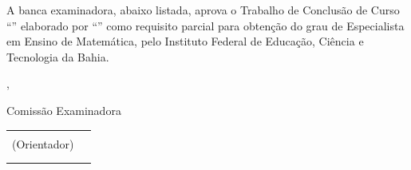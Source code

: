 %
%
\makeatletter
\begin{folhadeaprovacao}

	\begin{center}
		\ABNTEXchapterfont\textbf{\MakeUppercase\imprimirautor}
	\end{center}

	\vspace*{50pt}

	\begin{center}
		\ABNTEXchapterfont\textbf{\MakeUppercase\imprimirtitulo}
		\abntex@ifnotempty{\imprimirsubtitulo}{
			{\ABNTEXchapterfont\Large\scshape{\hspace*{-0.3em}: }}{\ABNTEXchapterfont\large\scshape\imprimirsubtitulo}
		}
	\end{center}
	\vspace*{30pt}
A banca examinadora, abaixo listada, aprova o Trabalho de Conclusão de Curso “\imprimirtitulo” elaborado por “\imprimirautor” como requisito parcial para obtenção do grau de Especialista em Ensino de Matemática, pelo Instituto Federal de Educação, Ciência e Tecnologia da Bahia.
	\vspace*{30pt}

	\begin{center}
		\imprimirlocal, \imprimirdatadefesa
		\end{center}
		
		\vspace*{7pt}
		\begin{center}
		Comissão Examinadora
		\end{center}
\vspace{-30pt}
\begin{center}
\begin{tabular}{cc}
	\assinatura{\textbf{\imprimirorientador} - IFBA\\ (Orientador)}&\\
		\assinatura{\textbf{\imprimirbancamembrointerno} - \imprimirbancainstmembrointerno} &\\
		\assinatura{\textbf{\imprimirbancamembroexterno} - \imprimirbancainstmembroexterno}&\\
	
\end{tabular}
	

\end{center}
\end{folhadeaprovacao}
